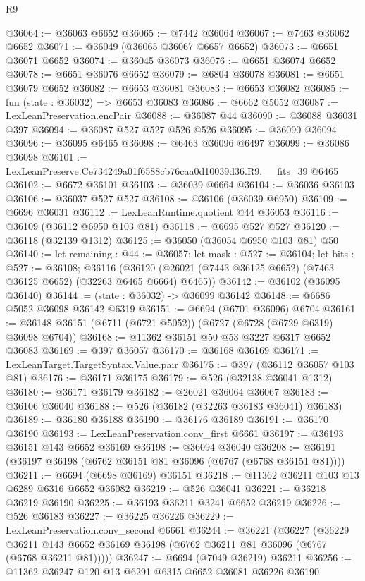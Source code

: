 \begin{lexlean}{R9}
\begin{coremodule}
@36064 := @36063 @6652
@36065 := @7442 @36064
@36067 := @7463 @36062 @6652
@36071 := @36049 (@36065 @36067 @6657 @6652)
@36073 := @6651 @36071 @6652
@36074 := @36045 @36073
@36076 := @6651 @36074 @6652
@36078 := @6651 @36076 @6652
@36079 := @6804 @36078
@36081 := @6651 @36079 @6652
@36082 := @6653 @36081
@36083 := @6653 @36082
@36085 := fun (state : @36032) => @6653 @36083
@36086 := @6662 @5052
@36087 := LexLeanPreservation.encPair
@36088 := @36087 @44
@36090 := @36088 @36031 @397
@36094 := @36087 @527 @527 @526 @526
@36095 := @36090 @36094
@36096 := @36095 @6465
@36098 := @6463 @36096 @6497
@36099 := @36086 @36098
@36101 := LexLeanPreserve.Ce734249a01f6588cb76caa0d10039d36.R9.__fits_39 @6465
@36102 := @6672 @36101
@36103 := @36039 @6664
@36104 := @36036 @36103
@36106 := @36037 @527 @527
@36108 := @36106 (@36039 @6950)
@36109 := @6696 @36031
@36112 := LexLeanRuntime.quotient @44 @36053
@36116 := @36109 (@36112 @6950 @103 @81)
@36118 := @6695 @527 @527
@36120 := @36118 (@32139 @1312)
@36125 := @36050 (@36054 @6950 @103 @81) @50
@36140 := let remaining : @44 := @36057;
  let mask : @527 := @36104;
  let bits : @527 := @36108;
  @36116 (@36120 (@26021 (@7443 @36125 @6652) (@7463 @36125 @6652) (@32263 @6465 @6664) @6465))
@36142 := @36102 (@36095 @36140)
@36144 := (state : @36032) -> @36099 @36142
@36148 := @6686 @5052 @36098 @36142 @6319
@36151 := @6694 (@6701 @36096) @6704
@36161 := @36148 @36151 (@6711 (@6721 @5052)) (@6727 (@6728 (@6729 @6319) @36098 @6704))
@36168 := @11362 @36151 @50 @53 @3227 @6317 @6652 @36083
@36169 := @397 @36057
@36170 := @36168 @36169
@36171 := LexLeanTarget.TargetSyntax.Value.pair
@36175 := @397 (@36112 @36057 @103 @81)
@36176 := @36171 @36175
@36179 := @526 (@32138 @36041 @1312)
@36180 := @36171 @36179
@36182 := @26021 @36064 @36067
@36183 := @36106 @36040
@36188 := @526 (@36182 (@32263 @36183 @36041) @36183)
@36189 := @36180 @36188
@36190 := @36176 @36189
@36191 := @36170 @36190
@36193 := LexLeanPreservation.conv_first @6661
@36197 := @36193 @36151 @143 @6652 @36169
@36198 := @36094 @36040
@36208 := @36191 (@36197 @36198 (@6762 @36151 @81 @36096 (@6767 (@6768 @36151 @81))))
@36211 := @6694 (@6698 @36169) @36151
@36218 := @11362 @36211 @103 @13 @6289 @6316 @6652 @36082
@36219 := @526 @36041
@36221 := @36218 @36219 @36190
@36225 := @36193 @36211 @3241 @6652 @36219
@36226 := @526 @36183
@36227 := @36225 @36226
@36229 := LexLeanPreservation.conv_second @6661
@36244 := @36221
    (@36227
      (@36229 @36211 @143 @6652 @36169 @36198 (@6762 @36211 @81 @36096 (@6767 (@6768 @36211 @81)))))
@36247 := @6694 (@7049 @36219) @36211
@36256 := @11362 @36247 @120 @13 @6291 @6315 @6652 @36081 @36226 @36190

\end{coremodule}
\end{lexlean}
